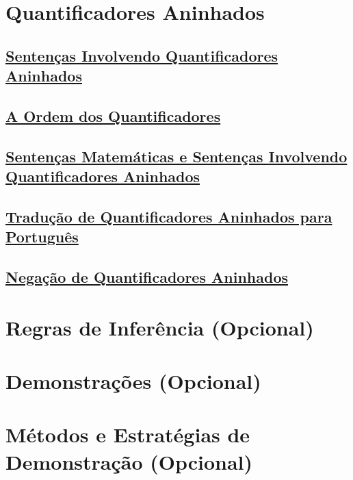 \section{Quantificadores Aninhados}

\subsection*{\underline{Sentenças Involvendo Quantificadores Aninhados}}
\subsection*{\underline{A Ordem dos Quantificadores}}
\subsection*{\underline{Sentenças Matemáticas e Sentenças Involvendo Quantificadores
Aninhados}}
\subsection*{\underline{Tradução de Quantificadores Aninhados para Português}}
\subsection*{\underline{Negação de Quantificadores Aninhados}}

\section{Regras de Inferência (Opcional)}
\section{Demonstrações (Opcional)}
\section{Métodos e Estratégias de Demonstração (Opcional)}